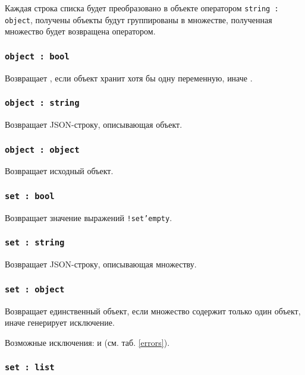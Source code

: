 Каждая строка списка будет преобразовано в объекте оператором \texttt{string : object}, получены объекты будут группированы в множестве, полученная множество будет возвращена оператором.

\subsubsection{\texttt{object : bool}}

Возвращает \true, если объект хранит хотя бы одну переменную, иначе \false.

\subsubsection{\texttt{object : string}}

Возвращает JSON-строку, описывающая объект.

\subsubsection{\texttt{object : object}}

Возвращает исходный объект.

\subsubsection{\texttt{set : bool}}

Возвращает значение выражений \texttt{!set'empty}.

\subsubsection{\texttt{set : string}}

Возвращает JSON-строку, описывающая множеству.

\subsubsection{\texttt{set : object}}

Возвращает единственный объект, если множество содержит только один объект, иначе генерирует исключение.

Возможные исключения:  и  (см. таб. \ref{errors}).

\subsubsection{\texttt{set : list}}

